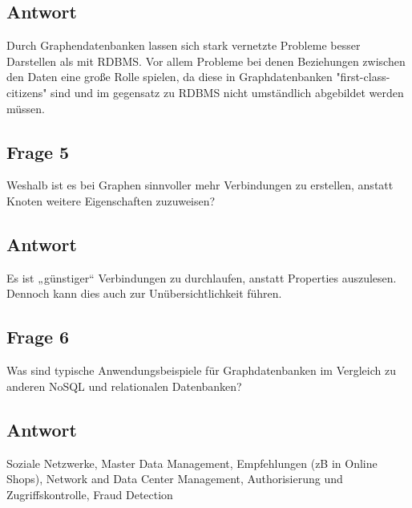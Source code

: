 \subsection*{Antwort}
Durch Graphendatenbanken lassen sich stark vernetzte Probleme besser Darstellen als mit RDBMS. Vor allem Probleme bei denen Beziehungen zwischen den Daten eine große Rolle spielen, da diese in Graphdatenbanken "first-class-citizens" sind und im gegensatz zu RDBMS nicht umständlich abgebildet werden müssen.
\subsection*{Frage 5}
Weshalb ist es bei Graphen sinnvoller mehr Verbindungen zu erstellen, anstatt Knoten weitere Eigenschaften zuzuweisen?
\subsection*{Antwort}
Es ist „günstiger“ Verbindungen zu durchlaufen, anstatt Properties auszulesen. Dennoch kann dies auch zur Unübersichtlichkeit führen.
\subsection*{Frage 6}
Was sind typische Anwendungsbeispiele für Graphdatenbanken im Vergleich zu anderen NoSQL und relationalen Datenbanken?
\subsection*{Antwort}
Soziale Netzwerke, Master Data Management, Empfehlungen (zB in Online Shops), Network and Data Center Management, Authorisierung und Zugriffskontrolle, Fraud Detection 
